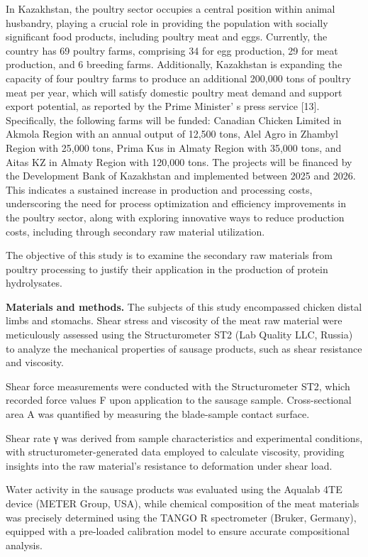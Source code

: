 In Kazakhstan, the poultry sector occupies a central position within
animal husbandry, playing a crucial role in providing the population
with socially significant food products, including poultry meat and
eggs. Currently, the country has 69 poultry farms, comprising 34 for egg
production, 29 for meat production, and 6 breeding farms. Additionally,
Kazakhstan is expanding the capacity of four poultry farms to produce an
additional 200,000 tons of poultry meat per year, which will satisfy
domestic poultry meat demand and support export potential, as reported
by the Prime Minister' s press service {[}13{]}.
Specifically, the following farms will be funded: Canadian Chicken
Limited in Akmola Region with an annual output of 12,500 tons, Alel Agro
in Zhambyl Region with 25,000 tons, Prima Kus in Almaty Region with
35,000 tons, and Aitas KZ in Almaty Region with 120,000 tons. The
projects will be financed by the Development Bank of Kazakhstan and
implemented between 2025 and 2026. This indicates a sustained increase
in production and processing costs, underscoring the need for process
optimization and efficiency improvements in the poultry sector, along
with exploring innovative ways to reduce production costs, including
through secondary raw material utilization.

The objective of this study is to examine the secondary raw materials
from poultry processing to justify their application in the production
of protein hydrolysates.

{\bfseries Materials and methods.} The subjects of this study encompassed
chicken distal limbs and stomachs. Shear stress and viscosity of the
meat raw material were meticulously assessed using the Structurometer
ST2 (Lab Quality LLC, Russia) to analyze the mechanical properties of
sausage products, such as shear resistance and viscosity.

Shear force measurements were conducted with the Structurometer ST2,
which recorded force values F upon application to the sausage sample.
Cross-sectional area A was quantified by measuring the blade-sample
contact surface.

Shear rate γ was derived from sample characteristics and experimental
conditions, with structurometer-generated data employed to calculate
viscosity, providing insights into the raw material's resistance to
deformation under shear load.

Water activity in the sausage products was evaluated using the Aqualab
4TE device (METER Group, USA), while chemical composition of the meat
materials was precisely determined using the TANGO R spectrometer
(Bruker, Germany), equipped with a pre-loaded calibration model to
ensure accurate compositional analysis.

